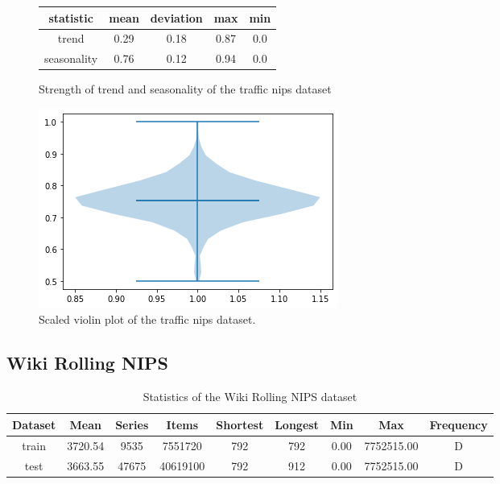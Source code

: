 \begin{figure}[htb]
    \centering
    \begin{center}
        \begin{tabular}{||c | c | c | c | c |}
            \hline
            statistic   & mean & deviation & max  & min \\
            \hline
            trend       & 0.29 & 0.18      & 0.87 & 0.0 \\
            \hline
            seasonality & 0.76 & 0.12      & 0.94 & 0.0 \\
            \hline
            \hline
        \end{tabular}
        \caption{Strength of trend and seasonality of the traffic nips dataset}
    \end{center}
    \endminipage\hfill
    \includegraphics[width=\linewidth]{./img/traffic_nips_violin.png}
    \caption{Scaled violin plot of the traffic nips dataset.}
    \label{fig:traffic_nips_violin}
    \endminipage\hfill
\end{figure}
\clearpage
\subsection{Wiki Rolling NIPS}

\begin{table}[htb]
    \begin{tabular}{||c | c c c c c c c c ||}
        \hline
        Dataset & Mean    & Series & Items    & Shortest & Longest & Min  & Max        & Frequency \\ [0.5ex]
        \hline\hline
        train   & 3720.54 & 9535   & 7551720  & 792      & 792     & 0.00 & 7752515.00 & D         \\
        \hline
        test    & 3663.55 & 47675  & 40619100 & 792      & 912     & 0.00 & 7752515.00 & D         \\
        \hline
    \end{tabular}
    \caption{Statistics of the Wiki Rolling NIPS dataset}
\end{table}


